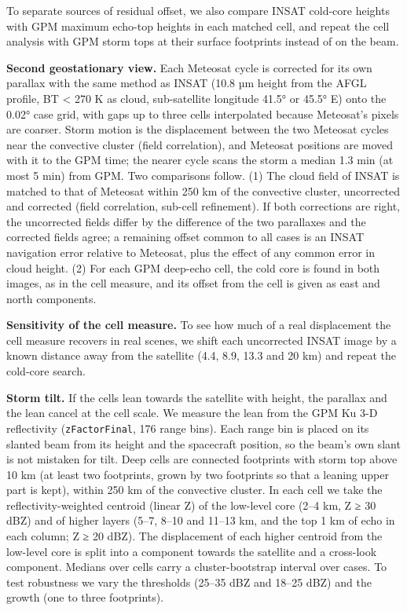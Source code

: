 To separate sources of residual offset, we also compare INSAT cold-core heights with GPM maximum echo-top heights in each matched cell, and repeat the cell analysis with GPM storm tops at their surface footprints instead of on the beam.

\textbf{Second geostationary view.} Each Meteosat cycle is corrected for its own parallax with the same method as INSAT (10.8 µm height from the AFGL profile, BT \textless{} 270 K as cloud, sub-satellite longitude 41.5° or 45.5° E) onto the 0.02° case grid, with gaps up to three cells interpolated because Meteosat's pixels are coarser. Storm motion is the displacement between the two Meteosat cycles near the convective cluster (field correlation), and Meteosat positions are moved with it to the GPM time; the nearer cycle scans the storm a median 1.3 min (at most 5 min) from GPM. Two comparisons follow. (1) The cloud field of INSAT is matched to that of Meteosat within 250 km of the convective cluster, uncorrected and corrected (field correlation, sub-cell refinement). If both corrections are right, the uncorrected fields differ by the difference of the two parallaxes and the corrected fields agree; a remaining offset common to all cases is an INSAT navigation error relative to Meteosat, plus the effect of any common error in cloud height. (2) For each GPM deep-echo cell, the cold core is found in both images, as in the cell measure, and its offset from the cell is given as east and north components.

\textbf{Sensitivity of the cell measure.} To see how much of a real displacement the cell measure recovers in real scenes, we shift each uncorrected INSAT image by a known distance away from the satellite (4.4, 8.9, 13.3 and 20 km) and repeat the cold-core search.

\textbf{Storm tilt.} If the cells lean towards the satellite with height, the parallax and the lean cancel at the cell scale. We measure the lean from the GPM Ku 3-D reflectivity (\texttt{zFactorFinal}, 176 range bins). Each range bin is placed on its slanted beam from its height and the spacecraft position, so the beam's own slant is not mistaken for tilt. Deep cells are connected footprints with storm top above 10 km (at least two footprints, grown by two footprints so that a leaning upper part is kept), within 250 km of the convective cluster. In each cell we take the reflectivity-weighted centroid (linear Z) of the low-level core (2--4 km, Z ≥ 30 dBZ) and of higher layers (5--7, 8--10 and 11--13 km, and the top 1 km of echo in each column; Z ≥ 20 dBZ). The displacement of each higher centroid from the low-level core is split into a component towards the satellite and a cross-look component. Medians over cells carry a cluster-bootstrap interval over cases. To test robustness we vary the thresholds (25--35 dBZ and 18--25 dBZ) and the growth (one to three footprints).

